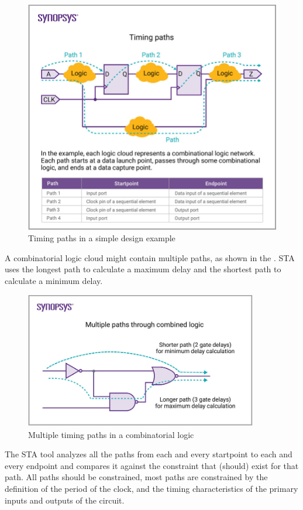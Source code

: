 \begin{figure}[H]
\begin{center}
\includegraphics[width=4.5in]{images/STAPaths.jpg}
\caption{Timing paths in a simple design example}
\label{STAPaths}
\end{center}
\end{figure}

A combinatorial logic cloud might contain multiple paths, as shown in the . STA uses the longest path to calculate a maximum delay and the shortest path to calculate a minimum delay.

\begin{figure}[H]
\begin{center}
\includegraphics[width=4in]{images/STAMultipath.jpg}
\caption{Multiple timing paths in a combinatorial logic}
\label{STAMultipath}
\end{center}
\end{figure}

The STA tool analyzes all the paths from each and every startpoint to each and every endpoint and compares it against the constraint that (should) exist for that path. All paths should be constrained, most paths are constrained by the definition of the period of the clock, and the timing characteristics of the primary inputs and outputs of the circuit.
\clearpage
